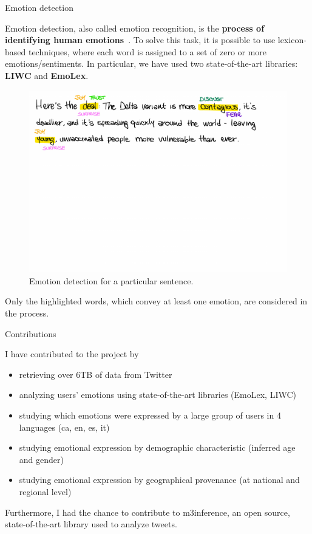 \documentclass[9pt,aspectratio=1610]{beamer}  %
\begin{document}
\begin{frame}{Emotion detection}

    Emotion detection, also called emotion recognition, is the \textbf{process of identifying human emotions}~\autocite{enwiki:1023798177}. To solve this task, it is possible to use lexicon-based techniques, where each word is assigned to a set of zero or more emotions/sentiments. In particular, we have used two state-of-the-art libraries: \textbf{LIWC} and \textbf{EmoLex}. 

    \begin{figure}[H]
    	\centering
    	\includegraphics[scale=.43,trim= 0 400 0 10, clip]{assets/img/emotion_detection_example.pdf}
    	\caption{Emotion detection for a particular sentence.}
    	\label{fig:emotion-detection-example}
    \end{figure}
    
    Only the highlighted words, which convey at least one emotion, are considered in the process.

\end{frame}

\begin{frame}{Contributions}

    I have contributed to the project by
    
    \begin{itemize}
    	\item retrieving over 6TB of data from Twitter
    	\item analyzing users' emotions using state-of-the-art libraries (EmoLex, LIWC)
    	\item studying which emotions were expressed by a large group of users in 4 languages (ca, en, es, it)
    	\item studying emotional expression by demographic characteristic (inferred age and gender)
    	\item studying emotional expression by geographical provenance (at national and regional level)
    \end{itemize}
    
    Furthermore, I had the chance to contribute to m3inference, an open source, state-of-the-art library used to analyze tweets.

\end{frame}
\end{document}
